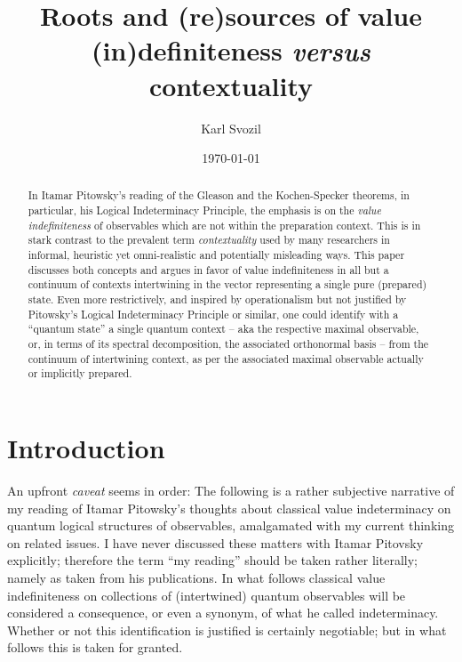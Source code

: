 \documentclass[%
  twocolumn,
 showpacs,
 showkeys,
 preprintnumbers,
 amsmath,amssymb,
 aps,
  pra,
  longbibliography,
 ]{revtex4-1}
\begin{document}
\title{Roots and (re)sources of value (in)definiteness {\it versus} contextuality}





\author{Karl Svozil}




\date{\today}

\begin{abstract}
In Itamar Pitowsky's reading of the Gleason and the Kochen-Specker theorems, in particular, his Logical Indeterminacy Principle, the emphasis is on the {\em value indefiniteness} of observables which are not within the preparation context. This is in stark contrast to the prevalent term {\em contextuality} used by many researchers in informal, heuristic yet omni-realistic and potentially misleading ways. This paper discusses both concepts and argues in favor of value indefiniteness in all but a continuum of contexts intertwining in the vector representing a single pure (prepared) state. Even more restrictively, and inspired by operationalism but not justified by Pitowsky's Logical Indeterminacy Principle or similar, one could identify with a ``quantum state'' a single quantum context -- aka the respective maximal observable, or, in terms of its spectral decomposition, the associated orthonormal basis -- from the continuum of intertwining context, as per the associated maximal observable actually or implicitly prepared.
\end{abstract}


\maketitle


\section{Introduction}

An upfront {\it caveat} seems in order: The following is a rather subjective narrative of my reading
of Itamar Pitowsky's thoughts about classical value indeterminacy on quantum logical structures of observables,
amalgamated with my current thinking on related issues.
I have never discussed these matters with Itamar Pitovsky
explicitly; therefore the term ``my reading'' should be taken rather literally; namely as taken
from his publications.
In what follows classical value indefiniteness on collections of (intertwined) quantum observables
will be considered a consequence, or even a synonym, of what he called indeterminacy.
Whether or not this identification is justified is certainly negotiable; but in what follows
this is taken for granted.
\end{document}
